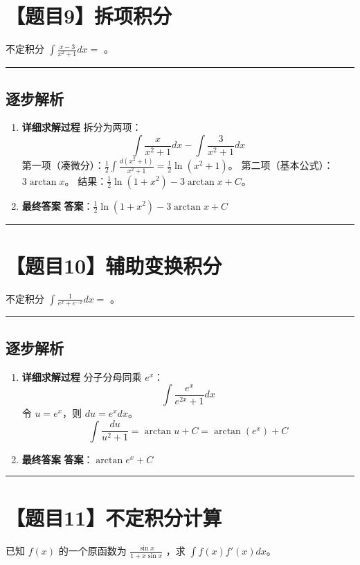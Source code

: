 \documentclass[UTF8]{ctexart}
\newenvironment{redenv}{\color{red}}{}
\newenvironment{detailedanalysis}{%
    \color{red}
    \begin{enumerate}[label=\textbf{第\arabic*步：}, leftmargin=*, align=left, itemsep=1.5ex]
}{%
    \end{enumerate}
}
\newcommand{\problemrule}{\noindent\rule{\textwidth}{1.5pt}\vspace{-0.8em}}
\newcommand{\analysisrule}{\noindent\rule{\textwidth}{0.8pt}\vspace{-0.8em}}
\newcommand{\blank}[1]{\underline{\hspace{#1}}}
\begin{document}
\section*{【题目9】拆项积分}
不定积分 $ \int\frac{x-3}{x^{2}+1}dx= $ \blank{2cm}。

\begin{redenv}
\analysisrule
\subsection*{逐步解析}

\begin{detailedanalysis}
\item \textbf{详细求解过程}
拆分为两项：
$$ \int \frac{x}{x^2+1} dx - \int \frac{3}{x^2+1} dx $$
第一项（凑微分）：$\frac{1}{2} \int \frac{d(x^2+1)}{x^2+1} = \frac{1}{2} \ln(x^2+1)$。
第二项（基本公式）：$3 \arctan x$。
结果：$\frac{1}{2}\ln(1+x^2) - 3\arctan x + C$。

\item \textbf{最终答案}
\textbf{答案}：$ \frac{1}{2}\ln(1+x^2) - 3\arctan x + C $
\end{detailedanalysis}
\end{redenv}

\problemrule
\section*{【题目10】辅助变换积分}
不定积分 $ \int \frac{1}{e^{x} + e^{-x}} dx = $ \blank{2cm}。

\begin{redenv}
\analysisrule
\subsection*{逐步解析}

\begin{detailedanalysis}
\item \textbf{详细求解过程}
分子分母同乘 $e^x$：
$$ \int \frac{e^x}{e^{2x} + 1} dx $$
令 $u = e^x$，则 $du = e^x dx$。
$$ \int \frac{du}{u^2+1} = \arctan u + C = \arctan(e^x) + C $$

\item \textbf{最终答案}
\textbf{答案}：$ \arctan e^x + C $
\end{detailedanalysis}
\end{redenv}

\problemrule
\section*{【题目11】不定积分计算}
已知 $ f(x) $ 的一个原函数为 $ \frac{\sin x}{1 + x \sin x} $ ，求 $ \int f(x) f'(x) dx $。
\end{document}
